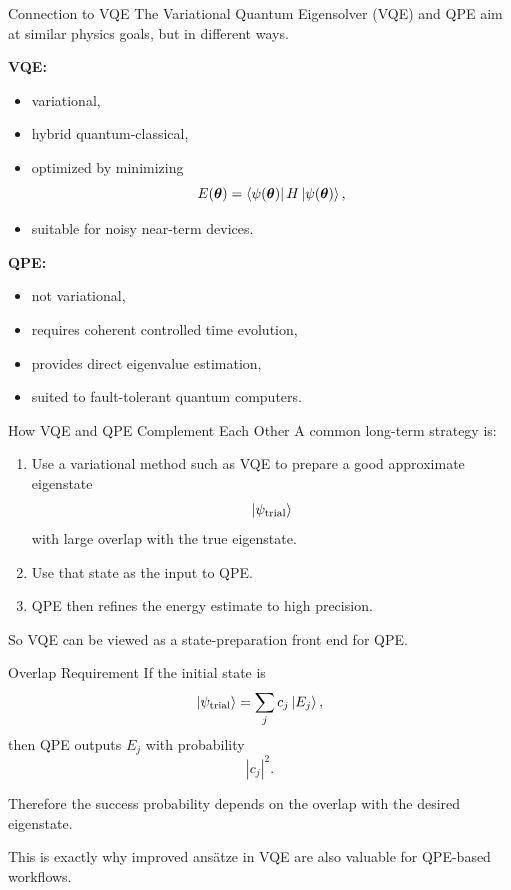 \documentclass{beamer}
\begin{document}
\begin{frame}{Connection to VQE}
The Variational Quantum Eigensolver (VQE) and QPE aim at similar physics goals, but in different ways.

\textbf{VQE:}
\begin{itemize}
\item variational,
\item hybrid quantum-classical,
\item optimized by minimizing
\[
E(\bm{\theta}) = \bra{\psi(\bm{\theta})} H \ket{\psi(\bm{\theta})},
\]
\item suitable for noisy near-term devices.
\end{itemize}

\textbf{QPE:}
\begin{itemize}
\item not variational,
\item requires coherent controlled time evolution,
\item provides direct eigenvalue estimation,
\item suited to fault-tolerant quantum computers.
\end{itemize}
\end{frame}

\begin{frame}{How VQE and QPE Complement Each Other}
A common long-term strategy is:
\begin{enumerate}
\item Use a variational method such as VQE to prepare a good approximate eigenstate
\[
\ket{\psi_{\mathrm{trial}}}
\]
with large overlap with the true eigenstate.

\item Use that state as the input to QPE.

\item QPE then refines the energy estimate to high precision.
\end{enumerate}

So VQE can be viewed as a state-preparation front end for QPE.
\end{frame}

\begin{frame}{Overlap Requirement}
If the initial state is
\[
\ket{\psi_{\mathrm{trial}}} = \sum_j c_j \ket{E_j},
\]
then QPE outputs \(E_j\) with probability
\[
|c_j|^2.
\]

Therefore the success probability depends on the overlap with the desired eigenstate.

This is exactly why improved ans\"atze in VQE are also valuable for QPE-based workflows.
\end{frame}
\end{document}
